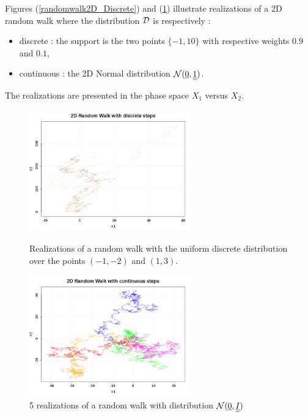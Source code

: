 Figures (\ref{randomwalk2D_Discrete}) and (\ref{randomwalk2D_Continuous}) illustrate realizations of a 2D random walk where the distribution ${\mathcal D}$ is respectively :
\begin{itemize}
\item discrete :  the support is the two points $\{-1, 10\}$ with respective weights $0.9$ and $0.1$,
\item continuous : the 2D Normal distribution ${\mathcal N}({\underline{0}},{\underline{\underline{1}}})$.
\end{itemize}
The realizations are  presented in the phase space $X_1$ versus $X_2$.


\begin{figure}[H]
  \begin{minipage}{9cm}
    \begin{center}
      \includegraphics[width=7cm]{Figures/randomwalk2D_discrete.png}
      \caption{Realizations of a random walk with the uniform discrete distribution over the points $(-1, -2)$ and $(1,3)$.}
      \label{randomwalk2D_Discrete}
    \end{center}
  \end{minipage}
  \hfill
  \begin{minipage}{9cm}
    \begin{center}
      \includegraphics[width=7cm]{Figures/randomwalk2D_continuous.png}
      \caption{5 realizations of a random walk with distribution ${\mathcal N}({\underline{0}},{\underline{\underline{I}}})$}
      \label{randomwalk2D_Continuous}
    \end{center}
  \end{minipage}
\end{figure}
